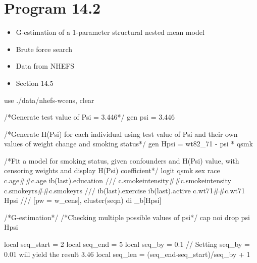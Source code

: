 \documentclass[
  10pt,
  a4paper,
]{book}
\newenvironment{Shaded}{\begin{snugshade}}{\end{snugshade}}
\newcommand{\CommentTok}[1]{\textcolor[rgb]{0.37,0.37,0.37}{#1}}
\newcommand{\FunctionTok}[1]{\textcolor[rgb]{0.28,0.35,0.67}{#1}}
\newcommand{\KeywordTok}[1]{\textcolor[rgb]{0.00,0.46,0.62}{#1}}
\newcommand{\NormalTok}[1]{\textcolor[rgb]{0.00,0.46,0.62}{#1}}
\newcommand{\OtherTok}[1]{\textcolor[rgb]{0.00,0.46,0.62}{#1}}
\providecommand{\tightlist}{%
  \setlength{\itemsep}{0pt}\setlength{\parskip}{0pt}}
\begin{document}
\hypertarget{program-14.2-1}{%
\section{Program 14.2}\label{program-14.2-1}}

\begin{itemize}
\tightlist
\item
  G-estimation of a 1-parameter structural nested mean model
\item
  Brute force search
\item
  Data from NHEFS
\item
  Section 14.5
\end{itemize}

\begin{Shaded}
\begin{Highlighting}[]
\KeywordTok{use}\NormalTok{ ./}\KeywordTok{data}\NormalTok{/nhefs{-}wcens, }\KeywordTok{clear}

\CommentTok{/*Generate test value of Psi = 3.446*/}
\KeywordTok{gen}\NormalTok{ psi = 3.446}

\CommentTok{/*Generate H(Psi) for each individual using test value of Psi and}
\CommentTok{their own values of weight change and smoking status*/}
\KeywordTok{gen}\NormalTok{ Hpsi = wt82\_71 {-} psi * qsmk }

\CommentTok{/*Fit a model for smoking status, given confounders and H(Psi) value, }
\CommentTok{with censoring weights and display H(Psi) coefficient*/}
\KeywordTok{logit}\NormalTok{ qsmk sex race c.age\#\#c.age ib(}\FunctionTok{last}\NormalTok{).education }\CommentTok{///}
\NormalTok{  c.smokeintensity\#\#c.smokeintensity c.smokeyrs\#\#c.smokeyrs }\CommentTok{///}
\NormalTok{  ib(}\FunctionTok{last}\NormalTok{).exercise ib(}\FunctionTok{last}\NormalTok{).active c.wt71\#\#c.wt71 Hpsi }\CommentTok{///}
\NormalTok{  [pw = w\_cens], }\KeywordTok{cluster}\NormalTok{(seqn)}
\KeywordTok{di}\NormalTok{ \_b[Hpsi]}

\CommentTok{/*G{-}estimation*/}
\CommentTok{/*Checking multiple possible values of psi*/}
\NormalTok{cap }\KeywordTok{noi} \KeywordTok{drop}\NormalTok{ psi Hpsi}

\KeywordTok{local}\NormalTok{ seq\_start = 2}
\KeywordTok{local}\NormalTok{ seq\_end = 5}
\KeywordTok{local}\NormalTok{ seq\_by = 0.1 }\CommentTok{// Setting seq\_by = 0.01 will yield the result 3.46}
\KeywordTok{local}\NormalTok{ seq\_len = (}\OtherTok{\textasciigrave{}seq\_end\textquotesingle{}}\NormalTok{{-}}\OtherTok{\textasciigrave{}seq\_start\textquotesingle{}}\NormalTok{)/}\OtherTok{\textasciigrave{}seq\_by\textquotesingle{}}\NormalTok{ + 1}
                 

\end{Highlighting}
\end{Shaded}
\end{document}
